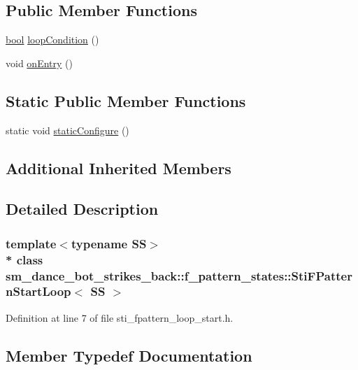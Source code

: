 \subsection*{Public Member Functions}
\begin{DoxyCompactItemize}
\item 
\hyperlink{classbool}{bool} \hyperlink{structsm__dance__bot__strikes__back_1_1f__pattern__states_1_1StiFPatternStartLoop_a6afa94fcfe689fa8ab1e1f521d04a8b4}{loop\+Condition} ()
\item 
void \hyperlink{structsm__dance__bot__strikes__back_1_1f__pattern__states_1_1StiFPatternStartLoop_a2f10c47b15ecf1f5aa36781436e3e7aa}{on\+Entry} ()
\end{DoxyCompactItemize}
\subsection*{Static Public Member Functions}
\begin{DoxyCompactItemize}
\item 
static void \hyperlink{structsm__dance__bot__strikes__back_1_1f__pattern__states_1_1StiFPatternStartLoop_a60491b3ac76a720525efcd7df0a26de5}{static\+Configure} ()
\end{DoxyCompactItemize}
\subsection*{Additional Inherited Members}


\subsection{Detailed Description}
\subsubsection*{template$<$typename SS$>$\\*
class sm\+\_\+dance\+\_\+bot\+\_\+strikes\+\_\+back\+::f\+\_\+pattern\+\_\+states\+::\+Sti\+F\+Pattern\+Start\+Loop$<$ S\+S $>$}



Definition at line 7 of file sti\+\_\+fpattern\+\_\+loop\+\_\+start.\+h.



\subsection{Member Typedef Documentation}
